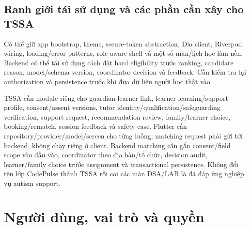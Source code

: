 \documentclass[11pt,a4paper]{article}
\begin{document}
\subsection{Ranh giới tái sử dụng và các phần cần xây cho TSSA}
Có thể giữ app bootstrap, theme, secure-token abstraction, Dio client, Riverpod wiring, loading/error patterns, role-aware shell và một số màn/lịch học làm nền. Backend có thể tái sử dụng cách đặt hard eligibility trước ranking, candidate reason, model/schema version, coordinator decision và feedback. Cần kiểm tra lại authorization và persistence trước khi đưa dữ liệu người học thật vào.

TSSA cần module riêng cho guardian-learner link, learner learning/support profile, consent/assent versions, tutor identity/qualification/safeguarding verification, support request, recommendation review, family/learner choice, booking/rematch, session feedback và safety case. Flutter cần repository/provider/model/screen cho từng luồng; matching request phải gửi tới backend, không chạy riêng ở client. Backend matching cần gắn consent/field scope vào đầu vào, coordinator theo địa bàn/tổ chức, decision audit, learner/family choice trước assignment và transactional persistence. Không đổi tên lớp CodePulse thành TSSA rồi coi các màn DSA/LAB là đã đáp ứng nghiệp vụ autism support.

\section{Người dùng, vai trò và quyền}
\end{document}
